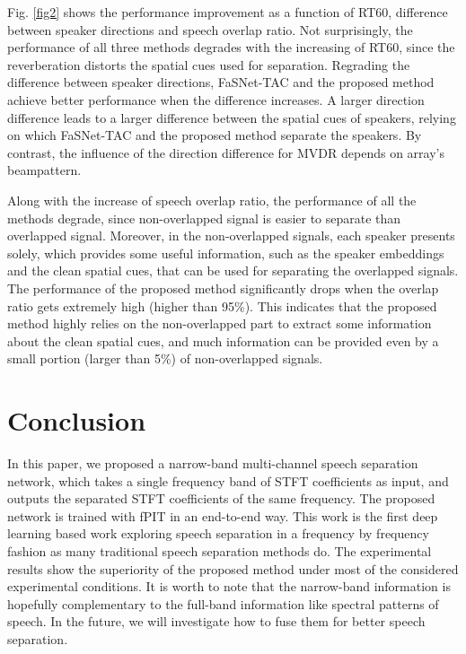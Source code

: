 \documentclass{article}
\begin{document}
Fig. \ref{fig2} shows the performance improvement as a function of RT60, difference between speaker directions and speech overlap ratio. 
Not surprisingly, the performance of all three methods degrades with the increasing of RT60, since the reverberation distorts the spatial cues used for separation.
Regrading the difference between speaker directions, FaSNet-TAC and the proposed method achieve better performance when the difference increases.
A larger direction difference leads to a larger difference between the spatial cues of speakers, relying on which FaSNet-TAC and the proposed method separate the speakers.
By contrast, the influence of the direction difference for MVDR depends on array's beampattern. 

Along with the increase of speech overlap ratio, the performance of all the methods degrade, since non-overlapped signal is easier to separate than overlapped signal. 
Moreover, in the non-overlapped signals, each speaker presents solely, which provides some useful information, such as the speaker embeddings and the clean spatial cues, that can be used for separating the overlapped signals.
The performance of the proposed method significantly drops when the overlap ratio gets extremely high (higher than 95\%).
This indicates that the proposed method highly relies on the non-overlapped part to extract some information about the clean spatial cues, and much information can be provided even by a small portion (larger than 5\%) of non-overlapped signals.

\section{Conclusion}
\label{sec:concl}

In this paper, we proposed a narrow-band multi-channel speech separation network, which takes a single frequency band of STFT coefficients as input, and outputs the separated STFT coefficients of the same frequency.
The proposed network is trained with fPIT in an end-to-end way.
This work is the first deep learning based work exploring speech separation in a frequency by frequency fashion as many traditional speech separation methods do.
The experimental results show the superiority of the proposed method under most of the considered experimental conditions.
It is worth to note that the narrow-band information is hopefully complementary to the full-band information like spectral patterns of speech.
In the future, we will investigate how to fuse them for better speech separation.



{\small
}
\end{document}
